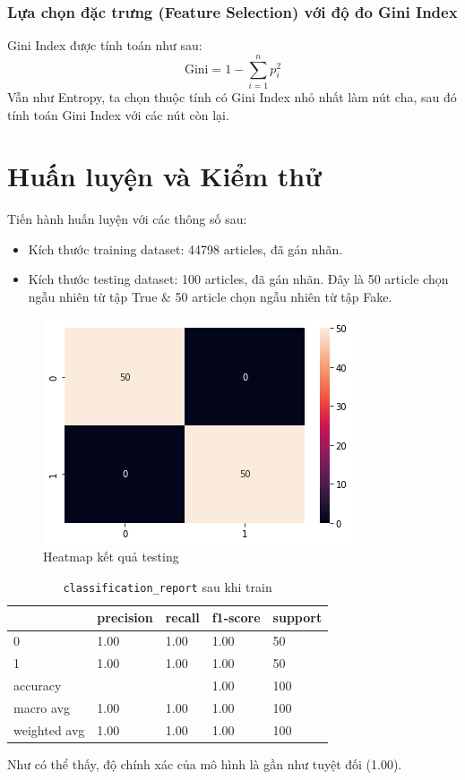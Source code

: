 \documentclass[12pt]{article}
\begin{document}
\subsubsection{Lựa chọn đặc trưng (Feature Selection) với độ đo Gini Index}
Gini Index được tính toán như sau:
$$
\text{Gini} = 1 - \sum_{i = 1}^n p_i ^ 2
$$
Vẫn như Entropy, ta chọn thuộc tính có Gini Index nhỏ nhất làm nút cha, sau đó tính toán Gini Index với các nút còn lại.

\section{Huấn luyện và Kiểm thử}
Tiến hành huấn luyện với các thông số sau:
\begin{itemize}
\item Kích thước training dataset: 44798 articles, đã gán nhãn.
\item Kích thước testing dataset: 100 articles, đã gán nhãn. Đây là 50 article chọn ngẫu nhiên từ tập True \& 50 article chọn ngẫu nhiên từ tập Fake.
\end{itemize}
\begin{multicols}{2}
\begin{figure}[H]
\centering
\includegraphics[scale=.5]{img/train-result.png}
\caption{Heatmap kết quả testing}
\label{fig:heatmap_testing}
\end{figure}
\begin{table}[H]
\centering
\begin{tabular}{l l l l l}
\hline
 & precision & recall & f1-score & support \\
\hline
0 & 1.00 & 1.00 & 1.00 & 50 \\
1 & 1.00 & 1.00 & 1.00 & 50 \\
accuracy &   &   & 1.00 & 100 \\
macro avg & 1.00 & 1.00 & 1.00 & 100 \\
weighted avg & 1.00 & 1.00 & 1.00 & 100 \\
\hline
\end{tabular}
\caption{\texttt{classification\_report} sau khi train}
\end{table}
\end{multicols}
Như có thể thấy, độ chính xác của mô hình là gần như tuyệt đối (1.00).
\end{document}
